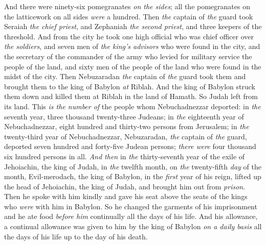 \begin{biblechapter}
\verse And there were ninety-six pomegranates \textit{on the sides}; all the pomegranates on the latticework on all sides \textit{were} a hundred.
\verse Then \textit{the} captain of \textit{the} guard took Seraiah \textit{the chief priest}, and Zephaniah \textit{the second priest}, and three keepers of the threshold.
\verse And from the city he took one high official who was chief officer over \textit{the soldiers}, and seven men of \textit{the king’s advisors} who were found in the city, and the secretary of the commander of the army who levied for military service the people of the land, and sixty men of the people of the land who were found in the midst of the city.
\verse Then Nebuzaradan \textit{the} captain of \textit{the} guard took them and brought them to the king of Babylon \textit{at} Riblah.
\verse And the king of Babylon struck them down and killed them at Riblah in the land of Hamath. So Judah left from its land.
\verse This \textit{is the number of} the people whom Nebuchadnezzar deported: in \textit{the} seventh year, three thousand twenty-three Judeans;
\verse in \textit{the} eighteenth year of Nebuchadnezzar, eight hundred and thirty-two persons from Jerusalem;
\verse in \textit{the} twenty-third year of Nebuchadnezzar, Nebuzaradan, \textit{the} captain of \textit{the} guard, deported seven hundred and forty-five Judean persons; \textit{there were} four thousand six hundred persons in all.
 \textit{And then} in \textit{the} thirty-seventh year of the exile of Jehoiachin, the king of Judah, in \textit{the} twelfth month, on \textit{the} twenty-fifth \textit{day} of the month, Evil-merodach, the king of Babylon, in the \textit{first} year of his reign, lifted up the head of Jehoiachin, the king of Judah, and brought him out from \textit{prison}.
\verse Then he spoke with him kindly and gave his seat above the seats of the kings who \textit{were} with him in Babylon.
\verse So he changed the garments of his imprisonment and he ate food \textit{before him} continually all the days of his life.
\verse And his allowance, a continual allowance was given to him by the king of Babylon \textit{on a daily basis} all the days of his life up to the day of his death.
\end{biblechapter}

